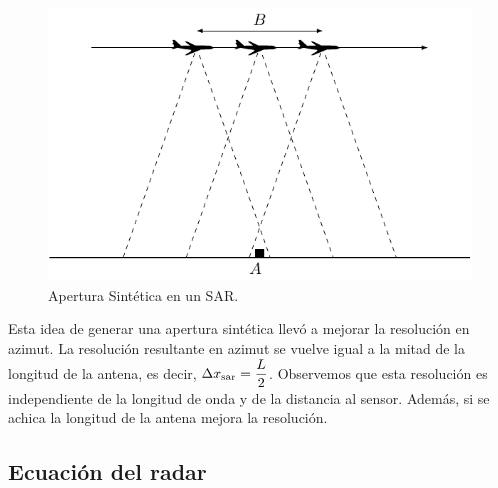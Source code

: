 \begin{figure}[hbt]
	\centering    
	\includegraphics[scale=0.7]{../../Figures/Tesis/Capitulo3/AperturaSintetica.pdf}
	\caption{\label{Apertura}Apertura Sintética en un SAR.} %
\end{figure} 


Esta idea de generar una apertura sintética llevó a mejorar la resolución en azimut. La resolución resultante en azimut se vuelve igual a la mitad de la longitud de la antena, es decir, $\Delta x_{\tiny \text{sar}}= \dfrac{L}{2}$.  Observemos que esta resolución es independiente de la longitud de onda y de la distancia al sensor. Además, si se achica la longitud de la antena mejora la resolución.

\subsection{Ecuación del radar}

